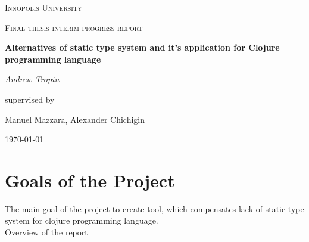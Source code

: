 \documentclass{report}
\begin{document}
\begin{titlepage}
	\centering
	{\scshape\LARGE Innopolis University \par}
	\vspace{1cm}
	{\scshape\Large Final thesis interim progress report \par}
	\vspace{1.5cm}
	{\huge\bfseries
    Alternatives of static type system and it's application for Clojure programming language
    \par}
	\vspace{2cm}
	{\Large\itshape Andrew Tropin\par}
	\vfill
	supervised by\par
	Manuel Mazzara, Alexander Chichigin

	\vfill

	{\large \today\par}
\end{titlepage}

\section*{Goals of the Project}

The main goal of the project to create tool, which compensates lack of static
type system for clojure programming language. \\
Overview of the report
\end{document}
